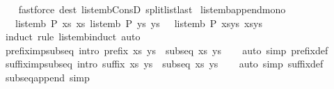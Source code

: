 \begin{isabellebody}
%
\isadelimproof
\ \ %
\endisadelimproof
%
\isatagproof
{}\isamarkupfalse%
\ {\isacharparenleft}fastforce\ dest{\isacharcolon}\ list{\isacharunderscore}emb{\isacharunderscore}ConsD\ split{\isacharunderscore}list{\isacharunderscore}last{\isacharparenright}%
\endisatagproof
{\isafoldproof}%
%
\isadelimproof
\isanewline
%
\endisadelimproof
\isanewline
{}\isamarkupfalse%
\ list{\isacharunderscore}emb{\isacharunderscore}append{\isacharunderscore}mono{\isacharcolon}\isanewline
\ \ {\isachardoublequoteopen}{\isasymlbrakk}\ list{\isacharunderscore}emb\ P\ xs\ xs{\isacharprime}{\isacharsemicolon}\ list{\isacharunderscore}emb\ P\ ys\ ys{\isacharprime}\ {\isasymrbrakk}\ {\isasymLongrightarrow}\ list{\isacharunderscore}emb\ P\ {\isacharparenleft}xs{\isacharat}ys{\isacharparenright}\ {\isacharparenleft}xs{\isacharprime}{\isacharat}ys{\isacharprime}{\isacharparenright}{\isachardoublequoteclose}\isanewline
%
\isadelimproof
\ \ %
\endisadelimproof
%
\isatagproof
{}\isamarkupfalse%
\ {\isacharparenleft}induct\ rule{\isacharcolon}\ list{\isacharunderscore}emb{\isachardot}induct{\isacharparenright}\ auto%
\endisatagproof
{\isafoldproof}%
%
\isadelimproof
\isanewline
%
\endisadelimproof
\isanewline
{}\isamarkupfalse%
\ prefix{\isacharunderscore}imp{\isacharunderscore}subseq\ {\isacharbrackleft}intro{\isacharbrackright}{\isacharcolon}\ {\isachardoublequoteopen}prefix\ xs\ ys\ {\isasymLongrightarrow}\ subseq\ xs\ ys{\isachardoublequoteclose}\isanewline
%
\isadelimproof
\ \ %
\endisadelimproof
%
\isatagproof
{}\isamarkupfalse%
\ {\isacharparenleft}auto\ simp{\isacharcolon}\ prefix{\isacharunderscore}def{\isacharparenright}%
\endisatagproof
{\isafoldproof}%
%
\isadelimproof
\isanewline
%
\endisadelimproof
\isanewline
{}\isamarkupfalse%
\ suffix{\isacharunderscore}imp{\isacharunderscore}subseq\ {\isacharbrackleft}intro{\isacharbrackright}{\isacharcolon}\ {\isachardoublequoteopen}suffix\ xs\ ys\ {\isasymLongrightarrow}\ subseq\ xs\ ys{\isachardoublequoteclose}\isanewline
%
\isadelimproof
\ \ %
\endisadelimproof
%
\isatagproof
{}\isamarkupfalse%
\ {\isacharparenleft}auto\ simp{\isacharcolon}\ suffix{\isacharunderscore}def{\isacharparenright}%
\endisatagproof
{\isafoldproof}%
%
\isadelimproof
%
\endisadelimproof
%
\isadelimdocument
%
\endisadelimdocument
%
\isatagdocument
%
\isamarkuptrue%
%
\endisatagdocument
{\isafolddocument}%
%
\isadelimdocument
%
\endisadelimdocument
{}\isamarkupfalse%
\ subseq{\isacharunderscore}append\ {\isacharbrackleft}simp{\isacharbrackright}{\isacharcolon}\isanewline

\end{isabellebody}
